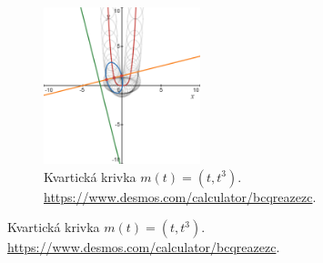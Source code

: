\documentclass{article}
\begin{document}
\begin{figure}[h]
    \hfill
    \begin{subfigure}[t]{0.49\textwidth}
        \centering
		\includegraphics[width=0.5\textwidth]{images/kvarticka_desmos.png}
		\caption{Kvartická krivka $m(t)= (t, t^3).$\\
		\url{https://www.desmos.com/calculator/bcqreazezc}.}
		\label{fig:kvarticka}
		\end{subfigure}
\end{figure}
\end{document}
